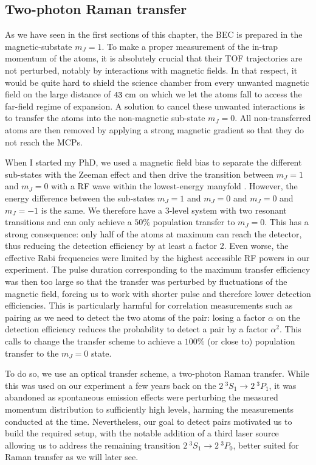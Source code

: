 \subsection{Two-photon Raman transfer}

\label{sec:raman}

As we have seen in the first sections of this chapter, the BEC is prepared in the magnetic-substate $m_J=1$. To make a proper measurement of the in-trap momentum of the atoms, it is absolutely crucial that their TOF trajectories are not perturbed, notably by interactions with magnetic fields. In that respect, it would be quite hard to shield the science chamber from every unwanted magnetic field on the large distance of $43 \ \rm{cm}$ on which we let the atoms fall to access the far-field regime of expansion. A solution to cancel these unwanted interactions is to transfer the atoms into the non-magnetic sub-state $m_J=0$. All non-transferred atoms are then removed by applying a strong magnetic gradient so that they do not reach the MCPs.

When I started my PhD, we used a magnetic field bias to separate the different sub-states with the Zeeman effect and then drive the transition between $m_J=1$ and $m_J=0$ with a RF wave within the lowest-energy manyfold \cite{carcy_these,cayla_these}. However, the energy difference between the sub-states $m_J=1$ and $m_J=0$ and $m_J=0$ and $m_J=-1$ is the same. We therefore have a 3-level system with two resonant transitions and can only achieve a $50\%$ population transfer to $m_J=0$. This has a strong consequence: only half of the atoms at maximum can reach the detector, thus reducing the detection efficiency by at least a factor 2. Even worse, the effective Rabi frequencies were limited by the highest accessible RF powers in our experiment. The pulse duration corresponding to the maximum transfer efficiency was then too large so that the transfer was perturbed by fluctuations of the magnetic field, forcing us to work with shorter pulse and therefore lower detection efficiencies. This is particularly harmful for correlation measurements such as \kmk pairing as we need to detect the two atoms of the pair: losing a factor $\alpha$ on the detection efficiency reduces the probability to detect a \kmk pair by a factor $\alpha^2$. This calls to change the transfer scheme to achieve a $100\%$ (or close to) population transfer to the $m_J=0$ state.

To do so, we use an optical transfer scheme, a two-photon Raman transfer. While this was used on our experiment a few years back on the $2 \ ^3 S_1 \rightarrow 2 \ ^3 P_1$, it was abandoned as spontaneous emission effects were perturbing the measured momentum distribution to sufficiently high levels, harming the measurements conducted at the time. Nevertheless, our goal to detect \kmk pairs motivated us to build the required setup, with the notable addition of a third laser source allowing us to address the remaining transition $2 \ ^3 S_1 \rightarrow 2 \ ^3 P_0$, better suited for Raman transfer as we will later see.



